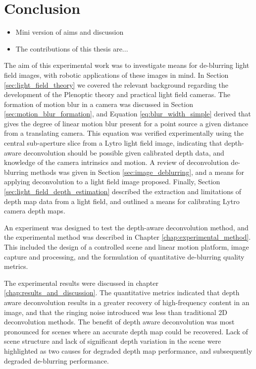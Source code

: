 
\chapter{Conclusion}
\label{chap:conclusion}
















\begin{itemize}
\item Mini version of aims and discussion
\item The contributions of this thesis are...
\end{itemize}

The aim of this experimental work was to investigate means for de-blurring light field images, with robotic applications of these images in mind.
In Section \ref{sec:light_field_theory} we covered the relevant background regarding the development of the Plenoptic theory and practical light field cameras.
The formation of motion blur in a camera was discussed in Section \ref{sec:motion_blur_formation}, and Equation \ref{eq:blur_width_simple} derived that gives the degree of linear motion blur present for a point source a given distance from a translating camera.
This equation was verified experimentally using the central sub-aperture slice from a Lytro light field image, indicating that depth-aware deconvolution should be possible given calibrated depth data, and knowledge of the camera intrinsics and motion.
A review of deconvolution de-blurring methods was given in Section \ref{sec:image_deblurring}, and a means for applying deconvolution to a light field image proposed.
Finally, Section \ref{sec:light_field_depth_estimation} described the extraction and limitations of depth map data from a light field, and outlined a means for calibrating Lytro camera depth maps.

An experiment was designed to test the depth-aware deconvolution method, and the experimental method was described in Chapter \ref{chap:experimental_method}.
This included the design of a controlled scene and linear motion platform, image capture and processing, and the formulation of quantitative de-blurring quality metrics.

The experimental results were discussed in chapter \ref{chap:results_and_discussion}.
The quantitative metrics indicated that depth aware deconvolution results in a greater recovery of high-frequency content in an image, and that the ringing noise introduced was less than traditional 2D deconvolution methods.
The benefit of depth aware deconvolution was most pronounced for scenes where an accurate depth map could be recovered.
Lack of scene structure and lack of significant depth variation in the scene were highlighted as two causes for degraded depth map performance, and subsequently degraded de-blurring performance.

